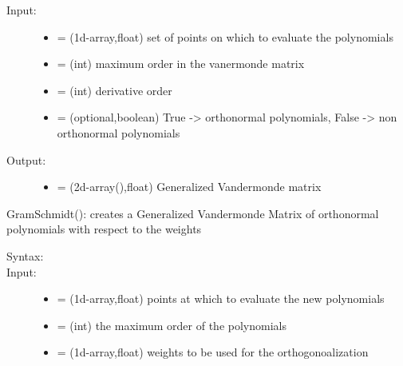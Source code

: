 \documentclass[letterpaper,10pt,english]{sphinxmanual}
\begin{document}
\begin{fulllineitems}
\begin{fulllineitems}
\begin{description}
\item[{Input:}] \leavevmode\begin{itemize}
\item {} 
 = (1d-array,float) set of  points on which to evaluate the polynomials

\item {} 
 = (int) maximum order in the vanermonde matrix

\item {} 
 = (int) derivative order

\item {} 
 = (optional,boolean) True -\textgreater{} orthonormal polynomials, False -\textgreater{} non orthonormal polynomials

\end{itemize}

\item[{Output:}] \leavevmode\begin{itemize}
\item {} 
 = (2d-array(),float) Generalized Vandermonde matrix

\end{itemize}

\end{description}

\end{fulllineitems}


\begin{fulllineitems}
\label{index:SpectralToolbox.Spectral1D.Poly1D.GramSchmidt}
GramSchmidt(): creates a Generalized Vandermonde Matrix of orthonormal polynomials with respect to the weights 
\begin{description}
\item[{Syntax:}] \leavevmode
{}

\item[{Input:}] \leavevmode\begin{itemize}
\item {} 
 = (1d-array,float) points at which to evaluate the new polynomials

\item {} 
 = (int) the maximum order of the polynomials

\item {} 
 = (1d-array,float) weights to be used for the orthogonoalization


\end{itemize}
\end{description}
\end{fulllineitems}
\end{fulllineitems}
\end{document}
